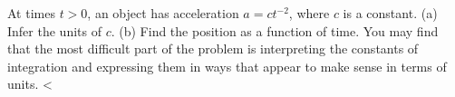 At times $t>0$, an object has acceleration $a=ct^{-2}$, where $c$
is a constant. (a) Infer the units of $c$. (b) Find the position
as a function of time. You may find that the most difficult part
of the problem is interpreting the constants of integration and
expressing them in ways that appear to make sense in terms of
units.
<%
